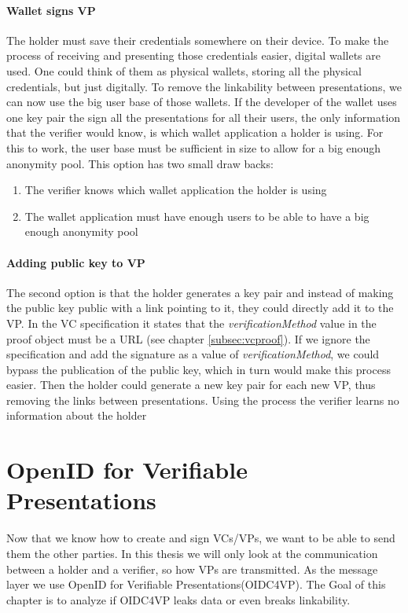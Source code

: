 \documentclass[
	a4paper               %
	,BCOR=0mm            %
	,bibliography=totoc   %
	,listof=totoc         %
	,monolingual
	,twoside=false
]{bfhthesis}              %
\begin{document}
\subsubsection{Wallet signs VP}
The holder must save their credentials somewhere on their device. To make the process of receiving and presenting those credentials easier, digital wallets are used.
One could think of them as physical wallets, storing all the physical credentials, but just digitally.
To remove the linkability between presentations, we can now use the big user base of those wallets. If the developer of the wallet uses one key pair the sign all the presentations for all their users, the only information that the verifier would know, is which wallet application a holder is using. For this to work, the user base must be sufficient in size to allow for a big enough anonymity pool. This option has two small draw backs:
\begin{enumerate}
	\item The verifier knows which wallet application the holder is using
	\item The wallet application must have enough users to be able to have a big enough anonymity pool
\end{enumerate}

\subsubsection{Adding public key to VP}
The second option is that the holder generates a key pair and instead of making the public key public with a link pointing to it, they could directly add it to the VP.
In the VC specification\cite{verifiable-credentials} it states that the \textit{verificationMethod} value in the proof object must be a URL (see chapter \ref{subsec:vcproof}).
If we ignore the specification and add the signature as a value of \textit{verificationMethod}, we could bypass the publication of the public key, which in turn would make this process easier.
Then the holder could generate a new key pair for each new VP, thus removing the links between presentations. Using the process the verifier learns no information about the holder


\chapter{OpenID for Verifiable Presentations}
Now that we know how to create and sign VCs/VPs, we want to be able to send them the other parties.
In this thesis we will only look at the communication between a holder and a verifier, so how VPs are transmitted.
As the message layer we use OpenID for Verifiable Presentations(OIDC4VP)\cite{oidc4vp}.
The Goal of this chapter is to analyze if OIDC4VP leaks data or even breaks linkability.
\end{document}
